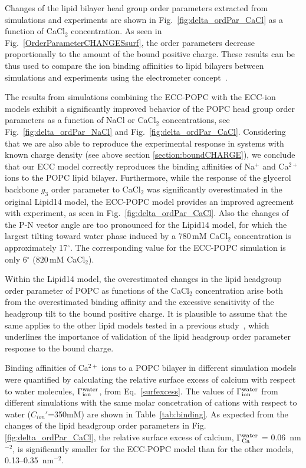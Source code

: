 Changes of the lipid bilayer head group order parameters extracted from simulations and 
experiments \citep{akutsu81, altenbach84} are shown in Fig.~\ref{fig:delta_ordPar_CaCl} 
as a function of CaCl$_2$ concentration. 
As seen in Fig.~\ref{OrderParameterCHANGESsurf}, the order parameters decrease 
proportionally to the amount of the bound positive charge. 
These results can be thus used to compare the ion binding affinities to lipid bilayers between 
simulations and experiments using the electrometer concept~\citep{seelig87, catte16}. 

The results from simulations combining the ECC-POPC with the ECC-ion models \citep{martinek17, kohagen16, Pluharova2014} exhibit a significantly improved behavior of the POPC head group order parameters as a function of NaCl or CaCl$_2$ concentrations, see Fig.~\ref{fig:delta_ordPar_NaCl} and Fig.~\ref{fig:delta_ordPar_CaCl}. Considering that we are also able to reproduce the experimental response in systems with known charge density (see above section \ref{section:boundCHARGE}), we conclude that our ECC model correctly reproduces the binding affinities of Na$^{+}$ and Ca$^{2+}$ ions to the POPC lipid bilayer. Furthermore, while the response of the glycerol backbone $g_3$ order parameter to CaCl$_2$ was significantly overestimated in the original Lipid14 model, the ECC-POPC model provides an improved agreement with experiment, as seen in Fig.~\ref{fig:delta_ordPar_CaCl}. 
Also the changes of the P-N vector angle are too pronounced for the Lipid14 model, 
for which the largest tilting toward water phase induced by a $780\,\mathrm{mM}$ 
CaCl$_2$ concentration is approximately 17$^{\circ}$. The corresponding value 
for the ECC-POPC simulation is only 6$^{\circ}$ ($820\,\mathrm{mM}$ CaCl$_2$).  

Within the Lipid14 model, the overestimated changes in the lipid headgroup order parameter of POPC  as functions of the CaCl$_2$ concentration arise both from the overestimated binding affinity and the excessive sensitivity of the headgroup tilt to the bound positive charge. It is plausible to assume that the same applies to the other lipid models tested in a previous study~\citep{catte16}, which underlines the importance of validation of the lipid headgroup order parameter response to the bound charge.  

 
Binding affinities of Ca$^{2+}$ ions to a POPC bilayer in different simulation models were quantified by calculating the relative surface excess of calcium with respect to water molecules, $\Gamma_{\rm ion}^{\rm water}$, from Eq.~\ref{surfexcess}. 
The values of $\Gamma_{\rm ion}^{\rm water}$ 
from different simulations with the same molar concetration of cations with respect 
to water ($C_{ion}'$=350mM) are shown in Table~\ref{tab:binding}. 
As expected from the changes of the lipid headgroup order parameters in Fig.~ \ref{fig:delta_ordPar_CaCl}, the relative surface excess of calcium, $\Gamma_{\rm Ca}^{\rm water}$ = 0.06~nm$^{-2}$, is significantly smaller for the ECC-POPC model than for the other models, 0.13--0.35~nm$^{-2}$. 
 


